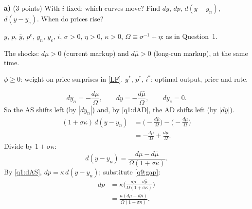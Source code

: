 

\textbf{a)} (3 points) With $i$ fixed: which curves move? Find $dy$, $dp$, $d(y-y_n)$, $d(y-y_e)$. When do prices rise?
\resolespaco
\begin{sol}
\begin{notacao}
\item $y$, $p$, $\bar y$, $p^e$, $y_n$, $y_e$, $i$, $\sigma>0$, $\eta>0$, $\kappa>0$, $\Omega\equiv\sigma^{-1}+\eta$: as in Question~1.
\item The shocks: $d\mu>0$ (current markup) and $d\bar\mu>0$ (long-run markup), at the same time.
\item $\phi\ge0$: weight on price surprises in \eqref{LF}. $y^*$, $p^*$, $i^*$: optimal output, price and rate.
\end{notacao}
\begin{equation}
dy_n=-\frac{d\mu}{\Omega},\qquad d\bar y=-\frac{d\bar\mu}{\Omega},\qquad dy_e=0 . \label{q9:shifts}
\end{equation}
So the AS shifts left (by $|dy_n|$) and, by \eqref{q1:dAD}, the AD shifts left (by $|d\bar y|$).
\begin{align}
(1+\sigma\kappa)\,d(y-y_n)&=\Big(-\frac{d\bar\mu}{\Omega}\Big)-\Big(-\frac{d\mu}{\Omega}\Big)\nonumber\\
&=-\frac{d\bar\mu}{\Omega}+\frac{d\mu}{\Omega} . \nonumber
\end{align}
Divide by $1+\sigma\kappa$:
\begin{equation}
d(y-y_n)=\frac{d\mu-d\bar\mu}{\Omega(1+\sigma\kappa)} . \label{q9:gap}
\end{equation}
By \eqref{q1:dAS}, $dp=\kappa\,d(y-y_n)$; substitute \eqref{q9:gap}:
\begin{align}
dp&=\kappa\Big(\frac{d\mu-d\bar\mu}{\Omega(1+\sigma\kappa)}\Big)\nonumber\\
&=\frac{\kappa(d\mu-d\bar\mu)}{\Omega(1+\sigma\kappa)} . \label{q9:dp}
\end{align}

\end{sol}
